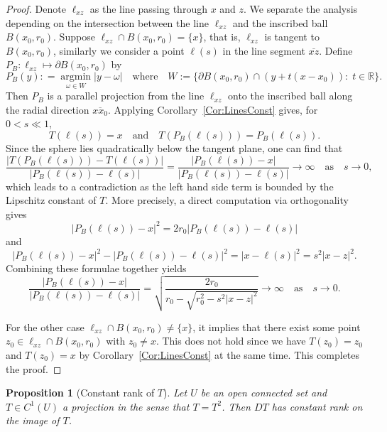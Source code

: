 \documentclass[11pt]{amsart}%
\theoremstyle{plain}
\newtheorem{proposition}[definition]{Proposition}
\newtheorem{lemma}[definition]{Lemma}
\def\q{\quad}
\newcommand{\1}{\mathbf{1}}
\newcommand{\M}{\mathcal{M}}
\begin{document}
\begin{proof}
    Denote $\ell_{xz}$ as the line passing through $x$ and $z$. We separate the analysis depending on the intersection between the line $\ell_{xz}$  and the inscribed ball $B(x_0, r_0)$. Suppose $\ell_{xz}\cap B(x_0, r_0) = \{x\}$, that is, $\ell_{xz}$ is tangent to $B(x_0, r_0)$, similarly we consider a point $\ell(s)$ in the line segment $\overline{xz}$. Define $P_B: \ell_{xz} \mapsto \partial B(x_0, r_0)$ by
    \[ P_B(y) : =  \mathop{\arg\min}\limits_{\omega\in W}|y-\omega| \q \text{where} \q W:=\{ \partial B(x_0, r_0) \cap (y + t(x -x_0)):\; t\in \mathbb{R} \}. \]
    Then $P_B$ is a parallel projection from the line $\ell_{xz}$ onto the inscribed ball along the radial direction $\overline{x x_0}$. Applying Corollary~\ref{Cor:LinesConst} gives, for $0 < s \ll 1$,
    \[ T(\ell(s))=x \q \text{and} \q T(P_B(\ell(s))) = P_B(\ell(s)). \]
    Since the sphere lies quadratically below the tangent plane, one can find that 
    \[ \frac{|T(P_B(\ell(s))) - T(\ell(s))|}{| P_B(\ell(s)) - \ell(s)|} = \frac{|P_B(\ell(s)) - x|}{|P_B(\ell(s)) - \ell(s)|} \to \infty \q \text{as} \q s \to 0, \]
    which leads to a contradiction as the left hand side term is bounded by the Lipschitz constant of $T$. More precisely, a direct computation via orthogonality gives
    \[ |P_B(\ell(s)) - x|^2 =2 r_0 |P_B(\ell(s)) - \ell(s)|\]
    and 
    \[ |P_B(\ell(s)) - x|^2 - |P_B(\ell(s)) - \ell(s)|^2 =|x-\ell(s)|^2 = s^2 |x-z|^2.  \]
    Combining these formulae together yields
    \[ \frac{|P_B(\ell(s)) - x|}{|P_B(\ell(s)) - \ell(s)|} = \sqrt{\frac{2 r_0}{r_0 - \sqrt{r_0^2 -s^2|x-z|^2}}} \to \infty \q \text{as} \q s \to 0.\]

    For the other case $\ell_{xz}\cap B(x_0, r_0) \neq \{x\}$, it implies that there exist some point $z_0 \in \ell_{xz}\cap B(x_0, r_0)$ with $z_0\neq x$. This does not hold since we have $T(z_0)=z_0$ and $T(z_0)=x$ by Corollary~\ref{Cor:LinesConst} at the same time. This completes the proof.
\end{proof}

\begin{proposition}[Constant rank of $T$]
    Let $U$ be an open connected set and $T\in C^1(U)$ a projection in the sense that $T=T^2$. Then $DT$ has constant rank on the image of $T$.
    \label{Prop:ConstRk}
\end{proposition}
\end{document}
